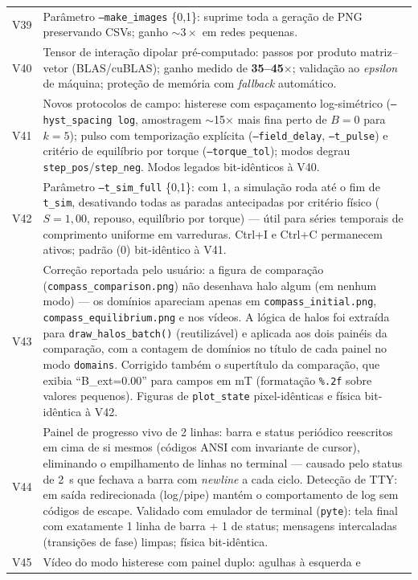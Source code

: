 \documentclass[11pt,a4paper]{article}
\newcommand{\code}[1]{\texttt{#1}}
\begin{document}
\begin{table}[h]
\begin{tabular}{@{}lp{11.5cm}@{}}
V39 & Parâmetro \code{--make\_images} \{0,1\}: suprime toda a geração
de PNG preservando CSVs; ganho $\sim 3\times$ em redes pequenas. \\
V40 & Tensor de interação dipolar pré-computado: passos por produto
matriz--vetor (BLAS/cuBLAS); ganho medido de \textbf{35--45$\times$};
validação ao \emph{epsilon} de máquina; proteção de memória com
\emph{fallback} automático. \\
V41 & Novos protocolos de campo: histerese com espaçamento
log-simétrico (\code{--hyst\_spacing log}, amostragem $\sim$15$\times$
mais fina perto de $B{=}0$ para $k{=}5$); pulso com temporização
explícita (\code{--field\_delay}, \code{--t\_pulse}) e critério de
equilíbrio por torque (\code{--torque\_tol}); modos degrau
\code{step\_pos}/\code{step\_neg}. Modos legados bit-idênticos à V40. \\
V42 & Parâmetro \code{--t\_sim\_full} \{0,1\}: com 1, a simulação roda
até o fim de \code{t\_sim}, desativando todas as paradas antecipadas por
critério físico ($S{=}1{,}00$, repouso, equilíbrio por torque) --- útil
para séries temporais de comprimento uniforme em varreduras. Ctrl+I e
Ctrl+C permanecem ativos; padrão (0) bit-idêntico à V41. \\
V43 & Correção reportada pelo usuário: a figura de comparação
(\code{compass\_comparison.png}) não desenhava halo algum (em nenhum
modo) --- os domínios apareciam apenas em \code{compass\_initial.png},
\code{compass\_equilibrium.png} e nos vídeos. A lógica de halos foi
extraída para \code{draw\_halos\_batch()} (reutilizável) e aplicada aos
dois painéis da comparação, com a contagem de domínios no título de
cada painel no modo \code{domains}. Corrigido também o supertítulo da
comparação, que exibia ``B\_ext=0.00'' para campos em mT (formatação
\code{\%.2f} sobre valores pequenos). Figuras de \code{plot\_state}
pixel-idênticas e física bit-idêntica à V42. \\
V44 & Painel de progresso vivo de 2 linhas: barra e status periódico
reescritos em cima de si mesmos (códigos ANSI com invariante de cursor),
eliminando o empilhamento de linhas no terminal --- causado pelo status
de 2~s que fechava a barra com \emph{newline} a cada ciclo. Detecção de
TTY: em saída redirecionada (log/pipe) mantém o comportamento de log
sem códigos de escape. Validado com emulador de terminal
(\code{pyte}): tela final com exatamente 1 linha de barra + 1 de
status; mensagens intercaladas (transições de fase) limpas; física
bit-idêntica. \\
V45 & Vídeo do modo histerese com painel duplo: agulhas à esquerda e

\end{tabular}
\end{table}
\end{document}
